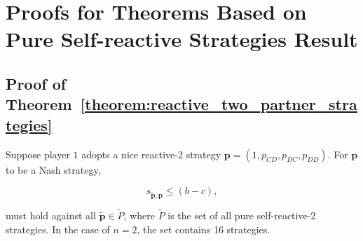 \documentclass[11pt]{article}
\theoremstyle{plainCl1}
\theoremstyle{plainCl2}
\begin{document}
\section{Proofs for Theorems Based on Pure Self-reactive Strategies Result}\label{appendix:proofs_for_theorems_pure_self_reactive}


\subsection{Proof of Theorem~\ref{theorem:reactive_two_partner_strategies}}\label{appendix:reactive_two_pure_self_reactive}

Suppose player $1$ adopts a nice reactive-2 strategy
$\mathbf{p}\!=\!(1, p_{CD}, p_{DC}, p_{DD})$. For $\mathbf{p}$ to be a Nash
strategy,

\begin{equation*}
  s_{\mathbf{\tilde{p}}, \mathbf{p}} \leq (b - c),
\end{equation*}

must hold against all \(\mathbf{\tilde{p}} \in \tilde{P}\), where \(\tilde{P}\) is the
set of all pure self-reactive-2 strategies. In the case of $n=2$, the set
contains 16 strategies.
\end{document}
